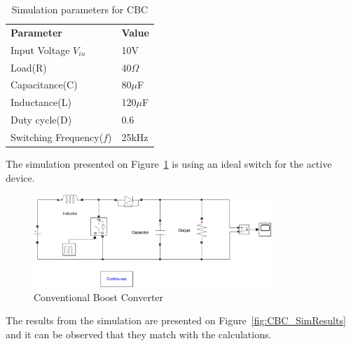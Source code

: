 \begin{table}[H]
\begin{center}
\caption {Simulation parameters for CBC} \label{tab:CBC} 
\begin{tabular}{|l|l|}
\cline{1-2}
\textbf{Parameter} & \textbf{Value}  \\ \cline{1-2}
Input Voltage $V_{in}$          &      10V   \\ \cline{1-2}
Load(R)   & 40$\Omega$           \\ \cline{1-2}
Capacitance(C)          &       80$\mu$F     \\ \cline{1-2}
Inductance(L)          &      120$\mu$F      \\ \cline{1-2}
Duty cycle(D)          &     0.6       \\ \cline{1-2}
Switching Frequency($f$)          &      25kHz      \\ \cline{1-2}
\end{tabular}
\end{center}
\end{table}

The simulation presented on Figure~\ref{fig:CBC_Sim} is using an ideal switch for the active device.

\begin{figure}[H]
   \centering
   \includegraphics[width=0.8\textwidth]{figures/aConventionalBoost/CBCpic.pdf}
    \caption{Conventional Boost Converter}
	\label{fig:CBC_Sim}
\end{figure}

The results from the simulation are presented on Figure~\ref{fig:CBC_SimResults} and it can be observed that they match with the calculations. 

